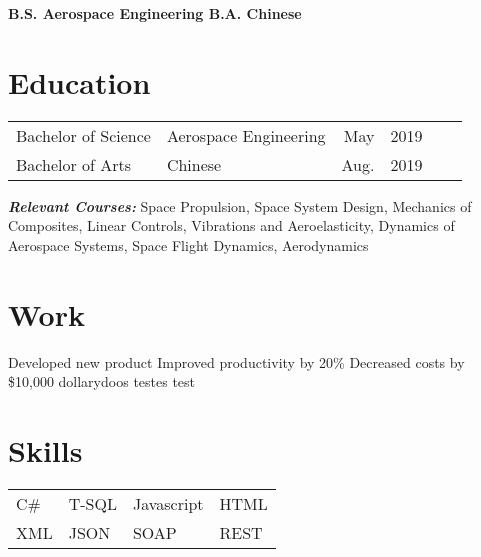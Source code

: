 \documentclass[letterpaper,11pt]{cv_format}
\begin{document}
\textbf{\centering B.S. Aerospace Engineering \hspace{1cm}\textperiodcentered\hspace{1cm}  B.A. Chinese\\}


\section{Education}

\vspace{-2em}
\begin{adjustwidth}{10em}{0em}
\begin{longtable}{p{.2\linewidth} p{.838\linewidth} rp{.05\linewidth} rp{.15\linewidth}}
Bachelor of Science & Aerospace Engineering & May & 2019 \\
Bachelor of Arts  & Chinese & Aug. & 2019
\end{longtable}
\end{adjustwidth}
\vspace{-2em}
\textbf{\emph{Relevant Courses:}} Space Propulsion, Space System Design, Mechanics of Composites, Linear Controls, Vibrations and Aeroelasticity, Dynamics of Aerospace Systems, Space Flight Dynamics, Aerodynamics

\section{Work}
\workitems
{Developed new product}
{Improved productivity by 20\%}
{Decreased costs by \$10,000 dollarydoos}
{testes}
 test

\section{Skills}
\begin{tabular}{l l l l}
C\# & T-SQL & Javascript & HTML \\
XML & JSON & SOAP & REST
\end{tabular}
 
\end{document}
